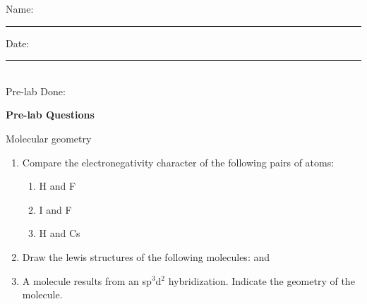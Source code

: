 \documentclass[main.tex]{subfiles}
\begin{document}
\begin{fullwidth}


\begin{multicols}{2}
\begin{tcolorbox}[enhanced jigsaw,breakable,size=title,
colback=mybrown!05,colframe=black,fonttitle=\bfseries,
title=STUDENT INFO,pad at break=1mm, break at=15cm/0pt ]
\vspace{0.2cm}
\noindent Name: \rule{5cm}{0.4pt}Date:\rule{1cm}{0.4pt}\\
Pre-lab Done: \quad
\end{tcolorbox}
\end{multicols}
\hfill
\vspace{0.2cm}
\begin{center}
{\large \bfseries 
Pre-lab Questions 
\par
\Huge
Molecular geometry
\\[5pt] \par}
\vspace{0.2cm}
\end{center}
\par
\noindent
\uline{  \hfill \normalsize \hfill       }

\begin{enumerate}
\item  Compare the electronegativity character of the following pairs of atoms:
   \begin{multicols}{3}
\begin{enumerate}
\item H and F
\item I and F
\item H and Cs
\end{enumerate}
   \end{multicols}
\vspace{4cm}



\item  Draw the lewis structures of the following molecules:  and 
\vspace{4cm}




\item A molecule results from an sp$^3$d$^2$ hybridization. Indicate the geometry of the molecule.



\end{enumerate}



\end{fullwidth}
\end{document}
